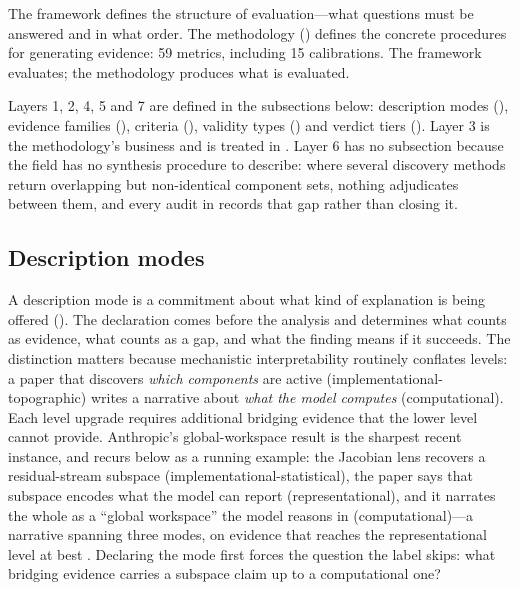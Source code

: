 \documentclass{article}
\begin{document}
The framework defines the structure of evaluation---what questions must be answered and in what order. The methodology () defines the concrete procedures for generating evidence: 59 metrics, including 15 calibrations. The framework evaluates; the methodology produces what is evaluated.

Layers 1, 2, 4, 5 and 7 are defined in the subsections below: description modes (), evidence families (), criteria (), validity types () and verdict tiers (). Layer 3 is the methodology's business and is treated in . Layer 6 has no subsection because the field has no synthesis procedure to describe: where several discovery methods return overlapping but non-identical component sets, nothing adjudicates between them, and every audit in  records that gap rather than closing it.


\subsection{Description modes}
\label{sec:description-modes}

A description mode is a commitment about what kind of explanation is being offered (). The declaration comes before the analysis and determines what counts as evidence, what counts as a gap, and what the finding means if it succeeds. The distinction matters because mechanistic interpretability routinely conflates levels: a paper that discovers \emph{which components} are active (implementational-topographic) writes a narrative about \emph{what the model computes} (computational). Each level upgrade requires additional bridging evidence that the lower level cannot provide. Anthropic's global-workspace result is the sharpest recent instance, and recurs below as a running example: the Jacobian lens recovers a residual-stream subspace (implementational-statistical), the paper says that subspace encodes what the model can report (representational), and it narrates the whole as a ``global workspace'' the model reasons in (computational)---a narrative spanning three modes, on evidence that reaches the representational level at best \citep{gurnee2026verbalizable}. Declaring the mode first forces the question the label skips: what bridging evidence carries a subspace claim up to a computational one?
\end{document}
